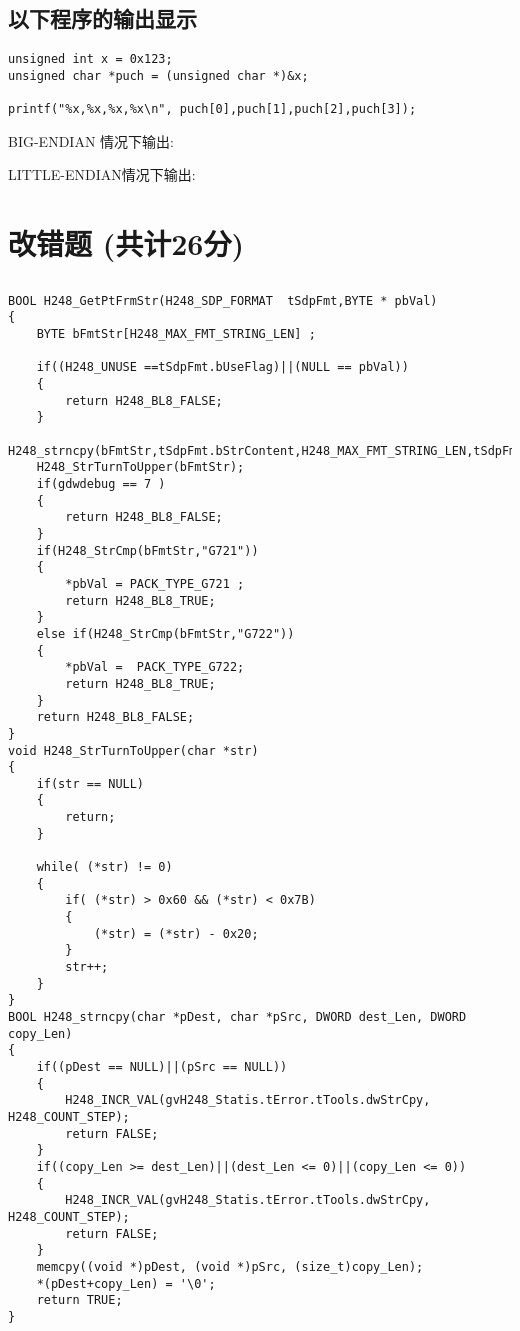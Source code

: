 ﻿\documentclass  [11pt,twocolumn]{article}
\begin{document}
\subsection{以下程序的输出显示}
\begin{lstlisting}
unsigned int x = 0x123;
unsigned char *puch = (unsigned char *)&x;

printf("%x,%x,%x,%x\n", puch[0],puch[1],puch[2],puch[3]);
\end{lstlisting}

\begin{minipage}{1\columnwidth}
\vspace{2ex}
BIG-ENDIAN   情况下输出:\myblank{10em}
\end{minipage}

\begin{minipage}{1\columnwidth}
\vspace{2ex}
LITTLE-ENDIAN情况下输出:\myblank{10em}
\vspace{2ex}
\end{minipage}

\section{改错题 (共计26分)}
\subsection{}
\begin{lstlisting}
BOOL H248_GetPtFrmStr(H248_SDP_FORMAT  tSdpFmt,BYTE * pbVal)
{
    BYTE bFmtStr[H248_MAX_FMT_STRING_LEN] ;

    if((H248_UNUSE ==tSdpFmt.bUseFlag)||(NULL == pbVal))
    {
        return H248_BL8_FALSE;
    }
    H248_strncpy(bFmtStr,tSdpFmt.bStrContent,H248_MAX_FMT_STRING_LEN,tSdpFmt.bStrLen);
    H248_StrTurnToUpper(bFmtStr);
    if(gdwdebug == 7 )
    {
        return H248_BL8_FALSE;
    }
    if(H248_StrCmp(bFmtStr,"G721"))
    {
        *pbVal = PACK_TYPE_G721 ;
        return H248_BL8_TRUE;
    }
    else if(H248_StrCmp(bFmtStr,"G722"))
    {
        *pbVal =  PACK_TYPE_G722;
        return H248_BL8_TRUE;
    }
    return H248_BL8_FALSE;
}
void H248_StrTurnToUpper(char *str)
{
    if(str == NULL)
    {
        return;
    }

    while( (*str) != 0)
    {
        if( (*str) > 0x60 && (*str) < 0x7B)
        {
            (*str) = (*str) - 0x20;
        }
        str++;
    }
}
BOOL H248_strncpy(char *pDest, char *pSrc, DWORD dest_Len, DWORD copy_Len)
{
    if((pDest == NULL)||(pSrc == NULL))
    {
        H248_INCR_VAL(gvH248_Statis.tError.tTools.dwStrCpy, H248_COUNT_STEP);
        return FALSE;
    }
    if((copy_Len >= dest_Len)||(dest_Len <= 0)||(copy_Len <= 0))
    {
        H248_INCR_VAL(gvH248_Statis.tError.tTools.dwStrCpy, H248_COUNT_STEP);
        return FALSE;
    }
    memcpy((void *)pDest, (void *)pSrc, (size_t)copy_Len);
    *(pDest+copy_Len) = '\0';
    return TRUE;
}
\end{lstlisting}
\newpage
\end{document}
